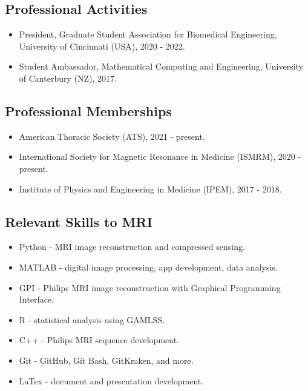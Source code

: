 \documentclass[12pt,]{scrartcl}
\begin{document}


\subsection{Professional Activities}\label{professional-activities}

\begin{itemize}
  \leftskip-0.25in
  \item President, Graduate Student Association for Biomedical Engineering, University of Cincinnati (USA), 2020 - 2022.
  \item Student Ambassador, Mathematical Computing and Engineering, University of Canterbury (NZ), 2017.

\end{itemize}

\subsection{Professional Memberships}\label{professional-memberships}

\begin{itemize}
  \leftskip-0.25in
  \item American Thoracic Society (ATS), 2021 - present.
  \item International Society for Magnetic Resonance in Medicine (ISMRM), 2020 - present.
  \item Institute of Physics and Engineering in Medicine (IPEM), 2017 - 2018.
\end{itemize}

\subsection{Relevant Skills to MRI}\label{relevant-skills}
\begin{itemize}
  \leftskip-0.25in
    \item Python - MRI image reconstruction and compressed sensing.
    \item MATLAB - digital image processing, app development, data analysis.
    \item GPI - Philips MRI image reconstruction with Graphical Programming Interface.
    \item R - statistical analysis using GAMLSS.
    \item C++ - Philips MRI sequence development.
    \item Git - GitHub, Git Bash, GitKraken, and more.
    \item LaTex - document and presentation development.

\end{itemize}
\end{document}
